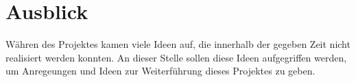 \section{Ausblick}
\label{sec:Ausblick}

Währen des Projektes kamen viele Ideen auf, die innerhalb der gegeben Zeit nicht realisiert werden konnten. An dieser Stelle sollen diese Ideen aufgegriffen werden, um Anregeungen und Ideen zur Weiterführung dieses Projektes zu geben.

